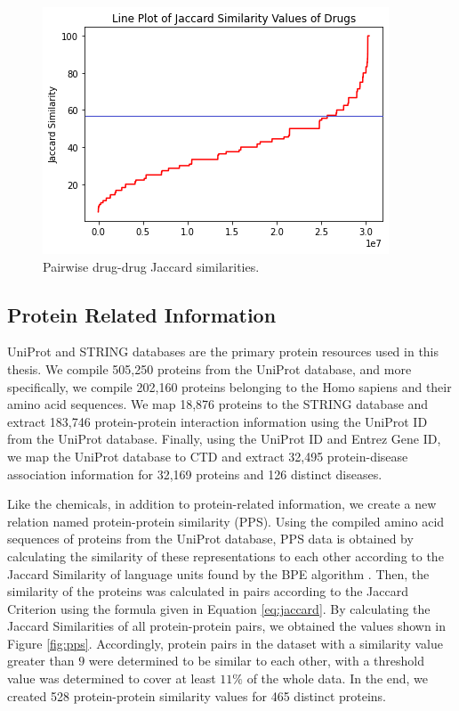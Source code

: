 \begin{figure}[h]
    \centering
        \includegraphics[width=0.5\linewidth]{chapters/materials_and_methods/figures/dds_line.png}
    \caption{Pairwise drug-drug Jaccard similarities.}
    \label{fig:dds}
\end{figure}

\subsection{Protein Related Information}
UniProt and STRING databases are the primary protein resources used in this thesis. We compile 505,250 proteins from the UniProt database, and more specifically, we compile 202,160 proteins belonging to the Homo sapiens and their amino acid sequences. We map 18,876 proteins to the STRING database and extract 183,746 protein-protein interaction information using the UniProt ID from the UniProt database. Finally, using the UniProt ID and Entrez Gene ID, we map the UniProt database to CTD and extract 32,495 protein-disease association information for 32,169 proteins and 126 distinct diseases.

Like the chemicals, in addition to protein-related information, we create a new relation named protein-protein similarity (PPS). Using the compiled amino acid sequences of proteins from the UniProt database, PPS data is obtained by calculating the similarity of these representations to each other according to the Jaccard Similarity of language units found by the BPE algorithm \cite{ozccelik2021debiaseddta}. Then, the similarity of the proteins was calculated in pairs according to the Jaccard Criterion using the formula given in Equation \ref{eq:jaccard}. By calculating the Jaccard Similarities of all protein-protein pairs, we obtained the values shown in Figure \ref{fig:pps}. Accordingly, protein pairs in the dataset with a similarity value greater than $9$ were determined to be similar to each other, with a threshold value was determined to cover at least $11\%$ of the whole data. In the end, we created 528 protein-protein similarity values for 465 distinct proteins.


